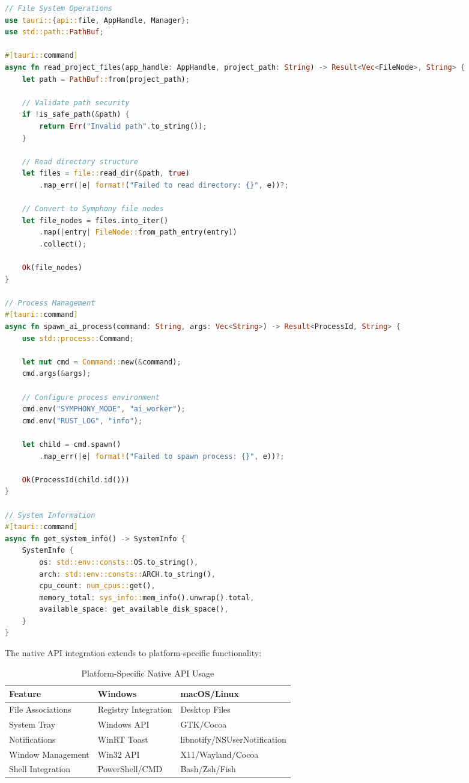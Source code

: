 \begin{lstlisting}[language=Rust, caption=Native API Integration in Symphony]
// File System Operations
use tauri::{api::file, AppHandle, Manager};
use std::path::PathBuf;

#[tauri::command]
async fn read_project_files(app_handle: AppHandle, project_path: String) -> Result<Vec<FileNode>, String> {
    let path = PathBuf::from(project_path);
    
    // Validate path security
    if !is_safe_path(&path) {
        return Err("Invalid path".to_string());
    }
    
    // Read directory structure
    let files = file::read_dir(&path, true)
        .map_err(|e| format!("Failed to read directory: {}", e))?;
    
    // Convert to Symphony file nodes
    let file_nodes = files.into_iter()
        .map(|entry| FileNode::from_path_entry(entry))
        .collect();
    
    Ok(file_nodes)
}

// Process Management
#[tauri::command]
async fn spawn_ai_process(command: String, args: Vec<String>) -> Result<ProcessId, String> {
    use std::process::Command;
    
    let mut cmd = Command::new(&command);
    cmd.args(&args);
    
    // Configure process environment
    cmd.env("SYMPHONY_MODE", "ai_worker");
    cmd.env("RUST_LOG", "info");
    
    let child = cmd.spawn()
        .map_err(|e| format!("Failed to spawn process: {}", e))?;
    
    Ok(ProcessId(child.id()))
}

// System Information
#[tauri::command]
async fn get_system_info() -> SystemInfo {
    SystemInfo {
        os: std::env::consts::OS.to_string(),
        arch: std::env::consts::ARCH.to_string(),
        cpu_count: num_cpus::get(),
        memory_total: sys_info::mem_info().unwrap().total,
        available_space: get_available_disk_space(),
    }
}
\end{lstlisting}

The native API integration extends to platform-specific functionality:

\begin{table}[h]
\centering
\caption{Platform-Specific Native API Usage}
\begin{tabular}{@{}lll@{}}
\toprule
\textbf{Feature} & \textbf{Windows} & \textbf{macOS/Linux} \\
\midrule
File Associations & Registry Integration & Desktop Files \\
System Tray & Windows API & GTK/Cocoa \\
Notifications & WinRT Toast & libnotify/NSUserNotification \\
Window Management & Win32 API & X11/Wayland/Cocoa \\
Shell Integration & PowerShell/CMD & Bash/Zsh/Fish \\
\bottomrule
\end{tabular}
\end{table}

